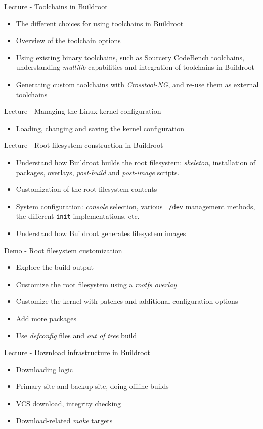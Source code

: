 \documentclass[a4paper,12pt,obeyspaces,spaces,hyphens]{article}
\begin{document}
\feagendaonecolumn
{Lecture - Toolchains in Buildroot}
{
  \begin{itemize}
  \item The different choices for using toolchains in Buildroot
  \item Overview of the toolchain options
  \item Using existing binary toolchains, such as Sourcery CodeBench
    toolchains, understanding {\em multilib} capabilities and
    integration of toolchains in Buildroot
  \item Generating custom toolchains with {\em Crosstool-NG}, and
    re-use them as external toolchains
  \end{itemize}
}

\feagendatwocolumn
{Lecture - Managing the Linux kernel configuration}
{
  \begin{itemize}
  \item Loading, changing and saving the kernel configuration
  \end{itemize}
}
{Lecture - Root filesystem construction in Buildroot}
{
  \begin{itemize}
  \item Understand how Buildroot builds the root filesystem: {\em
      skeleton}, installation of packages, overlays, {\em post-build}
    and {\em post-image} scripts.
  \item Customization of the root filesystem contents
  \item System configuration: {\em console} selection, various {\tt
      /dev} management methods, the different {\tt init}
    implementations, etc.
  \item Understand how Buildroot generates filesystem images
  \end{itemize}
}

\feagendaonecolumn
{Demo - Root filesystem customization}
{
  \begin{itemize}
  \item Explore the build output
  \item Customize the root filesystem using a {\em rootfs overlay}
  \item Customize the kernel with patches and additional configuration
    options
  \item Add more packages
  \item Use {\em defconfig} files and {\em out of tree} build
  \end{itemize}
}

\feagendaonecolumn
{Lecture - Download infrastructure in Buildroot}
{
  \begin{itemize}
  \item Downloading logic
  \item Primary site and backup site, doing offline builds
  \item VCS download, integrity checking
  \item Download-related {\em make} targets
  \end{itemize}
}
\end{document}
